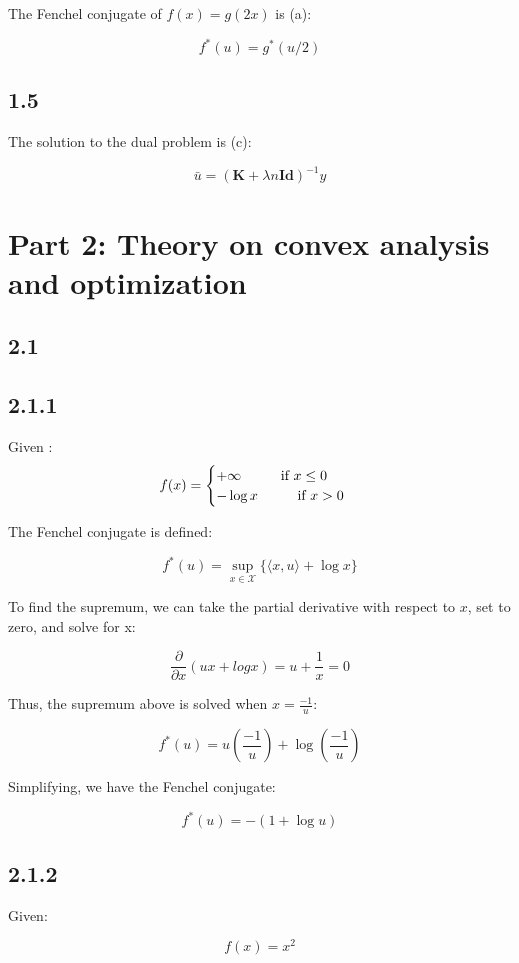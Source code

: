 \documentclass[12pt]{article}
\newcommand\tab[1][1cm]{\hspace*{#1}}
\begin{document}
The Fenchel conjugate of $f(x) = g(2x)$ is (a):

\[f^*(u) = g^*(u/2)\]

\subsection*{1.5}

The solution to the dual problem is (c):

\[\bar{u} = (\textbf{K}+\lambda n \textbf{Id})^{-1} y\]

\section*{Part 2: Theory on convex analysis and optimization}
\subsection*{2.1}


\subsection*{2.1.1}

Given :
\[ f(x) = \begin{cases}
      +\infty \tab \text{if } x \leq 0 \\
      -\log x \tab \text{if } x > 0 \\
   \end{cases}\]

The Fenchel conjugate is defined:

\[f^*(u) = \sup_{x\in \mathcal{X}} \{ \langle x, u\rangle +  \log x \}\]

To find the supremum, we can take the partial derivative with respect to $x$, set to zero, and solve for x:

\[\frac{\partial}{\partial x}(ux + logx) = u + \frac{1}{x} = 0\]

Thus, the supremum above is solved when $x=\frac{-1}{u}$:

\[f^*(u) = u \left(\frac{-1}{u} \right) +  \log\left(\frac{-1}{u} \right) \]

Simplifying, we have the Fenchel conjugate:

\[f^*(u) = - (1 + \log u)\]

\subsection*{2.1.2} Given:

\[f(x) = x^2\]
\end{document}
